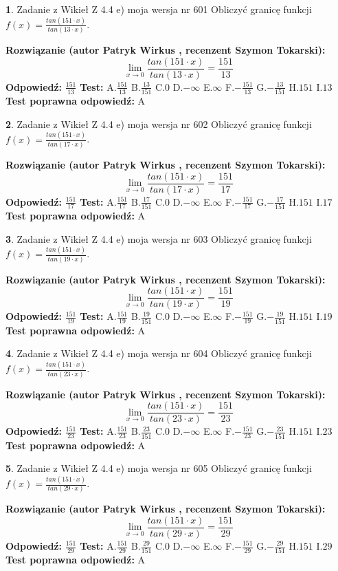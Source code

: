 \documentclass[12pt, a4paper]{article}
\theoremstyle{definition} %
\newtheorem{zad}{}
\newcommand{\zadStart}[1]{\begin{zad}#1\newline}
\newcommand{\zadStop}{\end{zad}}
\newcommand{\rozwStart}[2]{\noindent \textbf{Rozwiązanie (autor #1 , recenzent #2): }\newline}
\newcommand{\rozwStop}{\newline}
\newcommand{\odpStart}{\noindent \textbf{Odpowiedź:}\newline}
\newcommand{\odpStop}{\newline}
\newcommand{\testStart}{\noindent \textbf{Test:}\newline}
\newcommand{\testStop}{\newline}
\newcommand{\kluczStart}{\noindent \textbf{Test poprawna odpowiedź:}\newline}
\newcommand{\kluczStop}{\newline}
\begin{document}
\zadStart{Zadanie z Wikieł Z 4.4 e) moja wersja nr 601}
Obliczyć granicę funkcji $f(x)=\frac{tan(151\cdot x)}{tan(13\cdot x)}$.
\zadStop
\rozwStart{Patryk Wirkus}{Szymon Tokarski}
$$\lim\limits_{x\to 0}\frac{tan(151\cdot x)}{tan(13\cdot x)}=
\frac{151}{13}$$
\rozwStop
\odpStart
$\frac{151}{13}$
\odpStop
\testStart
A.$\frac{151}{13}$
B.$\frac{13}{151}$
C.$0$
D.$-\infty$
E.$\infty$
F.$-\frac{151}{13}$
G.$-\frac{13}{151}$
H.$151$
I.$13$
\testStop
\kluczStart
A
\kluczStop



\zadStart{Zadanie z Wikieł Z 4.4 e) moja wersja nr 602}
Obliczyć granicę funkcji $f(x)=\frac{tan(151\cdot x)}{tan(17\cdot x)}$.
\zadStop
\rozwStart{Patryk Wirkus}{Szymon Tokarski}
$$\lim\limits_{x\to 0}\frac{tan(151\cdot x)}{tan(17\cdot x)}=
\frac{151}{17}$$
\rozwStop
\odpStart
$\frac{151}{17}$
\odpStop
\testStart
A.$\frac{151}{17}$
B.$\frac{17}{151}$
C.$0$
D.$-\infty$
E.$\infty$
F.$-\frac{151}{17}$
G.$-\frac{17}{151}$
H.$151$
I.$17$
\testStop
\kluczStart
A
\kluczStop



\zadStart{Zadanie z Wikieł Z 4.4 e) moja wersja nr 603}
Obliczyć granicę funkcji $f(x)=\frac{tan(151\cdot x)}{tan(19\cdot x)}$.
\zadStop
\rozwStart{Patryk Wirkus}{Szymon Tokarski}
$$\lim\limits_{x\to 0}\frac{tan(151\cdot x)}{tan(19\cdot x)}=
\frac{151}{19}$$
\rozwStop
\odpStart
$\frac{151}{19}$
\odpStop
\testStart
A.$\frac{151}{19}$
B.$\frac{19}{151}$
C.$0$
D.$-\infty$
E.$\infty$
F.$-\frac{151}{19}$
G.$-\frac{19}{151}$
H.$151$
I.$19$
\testStop
\kluczStart
A
\kluczStop



\zadStart{Zadanie z Wikieł Z 4.4 e) moja wersja nr 604}
Obliczyć granicę funkcji $f(x)=\frac{tan(151\cdot x)}{tan(23\cdot x)}$.
\zadStop
\rozwStart{Patryk Wirkus}{Szymon Tokarski}
$$\lim\limits_{x\to 0}\frac{tan(151\cdot x)}{tan(23\cdot x)}=
\frac{151}{23}$$
\rozwStop
\odpStart
$\frac{151}{23}$
\odpStop
\testStart
A.$\frac{151}{23}$
B.$\frac{23}{151}$
C.$0$
D.$-\infty$
E.$\infty$
F.$-\frac{151}{23}$
G.$-\frac{23}{151}$
H.$151$
I.$23$
\testStop
\kluczStart
A
\kluczStop



\zadStart{Zadanie z Wikieł Z 4.4 e) moja wersja nr 605}
Obliczyć granicę funkcji $f(x)=\frac{tan(151\cdot x)}{tan(29\cdot x)}$.
\zadStop
\rozwStart{Patryk Wirkus}{Szymon Tokarski}
$$\lim\limits_{x\to 0}\frac{tan(151\cdot x)}{tan(29\cdot x)}=
\frac{151}{29}$$
\rozwStop
\odpStart
$\frac{151}{29}$
\odpStop
\testStart
A.$\frac{151}{29}$
B.$\frac{29}{151}$
C.$0$
D.$-\infty$
E.$\infty$
F.$-\frac{151}{29}$
G.$-\frac{29}{151}$
H.$151$
I.$29$
\testStop
\kluczStart
A
\kluczStop
\end{document}
